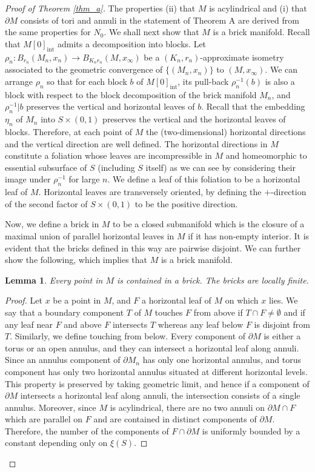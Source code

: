 \documentclass{amsart}
\newtheorem{lemma}[theorem]{Lemma}
\theoremstyle{definition}
\numberwithin{figure}{section}
\numberwithin{equation}{section}
\begin{document}
\begin{proof}[Proof of Theorem \ref{thm_a}]
The properties (ii) that $M$ is acylindrical and (i) that $\partial M$ consists of tori and annuli in the statement of Theorem A are derived from the same properties for $N_0$.
We shall next show that $M$ is a brick manifold.
Recall that $M[0]_\mathrm{int}$ admits  a decomposition into blocks.
Let $\rho_n: B_{r_n}(M_n ,x_n) \rightarrow B_{K_nr_n}(M, x_\infty)$ be a $(K_n,r_n)$-approximate isometry associated to the geometric convergence of $\{(M_n, x_n)\}$ to $(M,x_\infty)$.
We can arrange $\rho_n$ so that for each block $b$ of $M[0]_\mathrm{int}$, its pull-back $\rho_n^{-1}(b)$ is also a block with respect to the block decomposition of the brick manifold $M_n$, and $\rho_n^{-1}|b$ preserves the vertical and horizontal leaves of $b$.
Recall that the embedding $\eta_n$ of $M_n$ into $S \times (0,1)$ preserves the vertical and the horizontal leaves of blocks.
Therefore, at each point of $M$ the (two-dimensional) horizontal directions and the vertical direction are well defined.
The horizontal directions in $M$ constitute a foliation whose leaves are incompressible in $M$ and  homeomorphic to essential subsurface of $S$ (including $S$ itself) as we can see by considering their image under $\rho_n^{-1}$ for large $n$.
We define a leaf of this foliation to be a horizontal leaf of $M$.
Horizontal leaves are transversely oriented, by defining the $+$-direction of the second factor of  $S \times (0,1)$ to be the positive direction.

Now, we define a brick in $M$ to be a closed submanifold which is the closure of a maximal union of  parallel horizontal leaves in $M$ if it has non-empty interior.
It is evident that the bricks defined in this way are pairwise disjoint.
We can further show the following, which implies that $M$ is a brick manifold.
\begin{lemma}
\label{bricks}
Every point in $M$ is contained in a brick.
The bricks are locally finite.
\end{lemma}
\begin{proof}
Let $x$ be a point in $M$, and $F$ a horizontal leaf of $M$ on which $x$ lies.
We say that a boundary component $T$ of $M$ touches $F$ from above  if $T \cap F \neq \emptyset$ and if any leaf near $F$ and above $F$ intersects $T$ whereas any leaf below $F$ is disjoint from $T$.
Similarly, we define touching from below.
Every component of $\partial M$ is either a torus or an open annulus, and they can intersect a horizontal leaf along annuli.
Since  an annulus component of $\partial M_n$ has only one horizontal annulus, and torus component has only two horizontal annulus situated at  different horizontal levels.
This property is preserved by taking geometric limit, and hence if a component of $\partial M$ intersects a horizontal leaf along annuli, the intersection consists of a single annulus.
Moreover, since $M$ is acylindrical, there are no two annuli on $\partial M \cap F$ which are parallel on $F$ and are contained in distinct components of $\partial M$.
Therefore, the number of the components of $F \cap \partial M$ is uniformly bounded by a constant depending only on $\xi(S)$.


\end{proof}
\end{proof}
\end{document}
